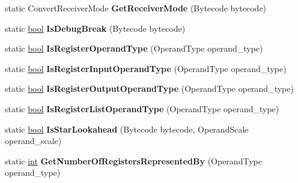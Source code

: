 \begin{DoxyCompactItemize}
static Convert\+Receiver\+Mode {\bfseries Get\+Receiver\+Mode} (Bytecode bytecode)
\item 
\mbox{\label{classv8_1_1internal_1_1interpreter_1_1Bytecodes_a7c63b8f1b462a5bf34d4a542403d78c8}} 
static \mbox{\hyperlink{classbool}{bool}} {\bfseries Is\+Debug\+Break} (Bytecode bytecode)
\item 
\mbox{\label{classv8_1_1internal_1_1interpreter_1_1Bytecodes_a7d3c91ed23038a19976d8af9da043f51}} 
static \mbox{\hyperlink{classbool}{bool}} {\bfseries Is\+Register\+Operand\+Type} (Operand\+Type operand\+\_\+type)
\item 
\mbox{\label{classv8_1_1internal_1_1interpreter_1_1Bytecodes_abc577a8cd4f913460335fc176437ad5e}} 
static \mbox{\hyperlink{classbool}{bool}} {\bfseries Is\+Register\+Input\+Operand\+Type} (Operand\+Type operand\+\_\+type)
\item 
\mbox{\label{classv8_1_1internal_1_1interpreter_1_1Bytecodes_a626ffd237701bcfeea88cbe36c9e2e3b}} 
static \mbox{\hyperlink{classbool}{bool}} {\bfseries Is\+Register\+Output\+Operand\+Type} (Operand\+Type operand\+\_\+type)
\item 
\mbox{\label{classv8_1_1internal_1_1interpreter_1_1Bytecodes_abb0613f9f91ebca474ab9aa88eb72d73}} 
static \mbox{\hyperlink{classbool}{bool}} {\bfseries Is\+Register\+List\+Operand\+Type} (Operand\+Type operand\+\_\+type)
\item 
\mbox{\label{classv8_1_1internal_1_1interpreter_1_1Bytecodes_ae93f888d61e3d512171c79f34438a681}} 
static \mbox{\hyperlink{classbool}{bool}} {\bfseries Is\+Star\+Lookahead} (Bytecode bytecode, Operand\+Scale operand\+\_\+scale)
\item 
\mbox{\label{classv8_1_1internal_1_1interpreter_1_1Bytecodes_a43e412644dbfb1e78b4db37b1d50b704}} 
static \mbox{\hyperlink{classint}{int}} {\bfseries Get\+Number\+Of\+Registers\+Represented\+By} (Operand\+Type operand\+\_\+type)
\item 

\end{DoxyCompactItemize}
